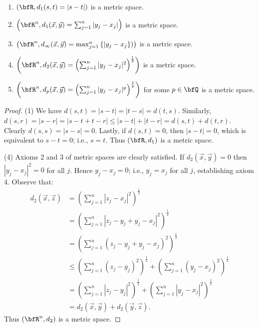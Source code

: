     \begin{proposition}
        \phantom{a}
        \begin{enumerate}[label = (\arabic*)]
            \item $\left(\bfR , d_1(s,t) = |s-t|\right)$ is a metric space.
            \item $\left(\bfR^n, d_1(\vec{x},\vec{y}) = \sum_{j=1}^n |y_j - x_j|\right)$ is a metric space.
            \item $\left(\bfR^n, d_\infty(\vec{x},\vec{y}) = \max_{j=1}^n \left\{|y_j - x_j\right\})\right)$ is a metric space.
            \item $\left(\bfR^n, d_2(\vec{x},\vec{y}) = \left(\sum_{j=1}^n |y_j - x_j|^2\right)^\frac{1}{2}\right)$ is a metric space.
            \item $\left(\bfR^n, d_p(\vec{x},\vec{y}) = \left(\sum_{j=1}^n |y_j - x_j|^p\right)^\frac{1}{p}\right)$ for some $p \in \bfQ$ is a metric space.
        \end{enumerate}
    \end{proposition}
        \begin{proof}
            (1) We have $d(s,t) = |s-t| = |t-s| = d(t,s)$. Similarly, $d(s,r) = |s-r| = |s-t + t -r| \leq |s-t| + |t-r| = d(s,t) + d(t,r)$. Clearly $d(s,s) = |s-s| = 0$. Lastly, if $d(s,t) =0$, then $|s-t| = 0$, which is equivalent to $s-t = 0$; i.e., $s=t$. Thus $(\bfR,d_1)$ is a metric space.

            (4) Axioms 2 and 3 of metric spaces are clearly satisfied. If $d_2(\vec{x},\vec{y}) = 0$ then $|y_j - x_j|^2 = 0$ for all $j$. Hence $y_j-x_j = 0$; i.e., $y_j = x_j$ for all $j$, establishing axiom 4. Observe that:
                \begin{equation*}
                \begin{split}
                    d_2(\vec{x},\vec{z})
                    & = \left(\sum_{j=1}^n |z_j - x_j|^2\right)^\frac{1}{2}\\
                    & = \left(\sum_{j=1}^n |z_j - y_j + y_j - x_j|^2\right)^\frac{1}{2} \\
                    & = \left(\sum_{j=1}^n (z_j - y_j + y_j -  x_j)^2\right)^\frac{1}{2} \\
                    & \leq \left(\sum_{j=1}^n (z_j - y_j)^2\right)^\frac{1}{2} + \left(\sum_{j=1}^n (y_j - x_j)^2\right)^\frac{1}{2} \\
                    & = \left(\sum_{j=1}^n |z_j - y_j|^2\right)^\frac{1}{2} + \left(\sum_{j=1}^n |y_j - x_j|^2\right)^\frac{1}{2} \\
                    & = d_2(\vec{x},\vec{y}) + d_2(\vec{y},\vec{z}).
                \end{split}
                \end{equation*}
            Thus $(\bfR^n , d_2)$ is a metric space.
        \end{proof}

